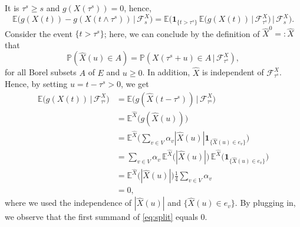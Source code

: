 \documentclass[11pt]{article}
\makeatletter
\renewenvironment{proof}[1][\proofname]{
   \par\pushQED{\qed}\normalfont
   \topsep6\p@\@plus6\p@\relax
   \trivlist\item[\hskip\labelsep\bfseries#1\@addpunct{.}]
   \ignorespaces
}{
   \popQED\endtrivlist\@endpefalse
}
\numberwithin{equation}{section}
\def\Ex{\mathbb{E}}
\def\indicator{\boldsymbol{1}}
\makeatother
\begin{document}
\begin{proof}[Proof of Lemma \ref{L: harmonic on cross}]
  It is $\tau^s \geq s$ and $g(X(\tau^s))=0$, hence,
  \begin{equation}\nonumber
    \Ex \big( g(X(t)) - g(X(t \land \tau^s)) 
        \,\big|\, \mathcal{F}^X_s \big) 
    = \Ex \big( \indicator_{\{ t> \tau^s\}}\,  \Ex \big(
        g(X(t))  
        \,\big|\, \mathcal{F}^X_{\tau^s} \big) 
        \,\big|\, \mathcal{F}^X_s \big).
  \end{equation}
  Consider the event $\{ t >\tau^s \}$; here, we can conclude 
  by the definition of $\hat{X}^0=: \hat{X}$ that 
  \begin{equation}\nonumber
    \mathbb{P}(\hat{X}(u) \in A) 
    = \mathbb{P}(X(\tau^s + u) \in A \,|\, 
      \mathcal{F}^X_{\tau^s}),
  \end{equation}
  for all Borel subsets $A$ of $E$ and $u \geq 0$.
  In addition, $\hat{X}$ is independent of $\mathcal{F}^X_{\tau^s}$. 
  Hence, by setting $u = t-\tau^s > 0$, we get 
  \begin{equation}\label{eq: Ex (g(X))=0}
    \begin{split}
      \Ex \big(g(X(t)) \,\big| \, \mathcal{F}^X_{\tau^s} \big)
      &= \Ex \big( g(\hat{X}(t - \tau^s)) 
      \,\big|\, \mathcal{F}^X_{\tau^s} \big)\\
      &= \Ex^{\hat{X}} 
          \big( g(\hat{X}(u)) \big)\\
      &= \Ex^{\hat{X}} \bigg( \sum_{v \in V} \alpha_v 
          |\hat{X}(u)| 
          \indicator_{\{\hat{X}(u) \in e_v\}} \bigg) \\
      &=  \sum_{v \in V} \alpha_v \,
      \Ex^{\hat{X}} \big( |\hat{X}(u)| \big)\, 
      \Ex^{\hat{X}} \big( \indicator_{ \{
            \hat{X}(u) \in e_v \}} \big)\\
      &=   \Ex ^{\hat{X}} \big(|\hat{X}(u)| \big)  
              \frac{1}{4}
                \sum_{v \in V} \alpha_v \\
      &= 0,
    \end{split}
  \end{equation}
  where we used the independence of $|\hat{X}(u)|$ and $\{\hat{X}(u) \in e_v\}$. 
  By plugging in, we observe that the first summand of \eqref{eq:split} equals $0$.


\end{proof}
\end{document}

